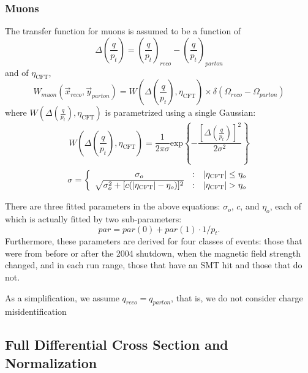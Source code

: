 \subsubsection{Muons}

The transfer function for muons is assumed to be a
function of
\begin{equation}
\Delta\left( \frac{q}{p_t}\right) =
\left( \frac{q}{p_t}\right)_{reco} -
\left( \frac{q}{p_t}\right)_{parton}
\end{equation}
\noindent and of $\eta_\mathrm{CFT}$,
\begin{equation}
W_{muon}(\vec{x}_{reco}, \vec{y}_{parton}) =
W\left(\Delta\left( \frac{q}{p_t}\right),
\eta_\mathrm{CFT}\right) \times 
\delta(\Omega_{reco} - \Omega_{parton})
\end{equation}
\noindent where $W\left(\Delta\left( \frac{q}{p_t}\right),
\eta_\mathrm{CFT}\right)$ is parametrized using a single Gaussian:
\begin{equation}
W\left(\Delta\left( \frac{q}{p_t}\right), \eta_\mathrm{CFT}\right) = 
\frac{1}{2\pi\sigma}\mathrm{exp}
\left\{-\frac{\left[\Delta
\left( \frac{q}{p_t} \right)\right]^2}
{2\sigma^2}\right\}
\end{equation}
\begin{equation}
\sigma  =  \left\{ 
\begin{array} {c@{\quad:\quad}l} \sigma_o &
|\eta_\mathrm{CFT}| \le \eta_o \\
\sqrt{\sigma^2_o + [c(|\eta_\mathrm{CFT}| - \eta_o)]^2} &
|\eta_\mathrm{CFT}| > \eta_o 
\end{array} \right.
\end{equation}

\noindent There are three fitted parameters in the above equations:
$\sigma_o$, $c$, and $\eta_o$, each of which is actually fitted by two
sub-parameters:
\begin{equation}
par = par(0) + par(1) \cdot 1/p_t.
\end{equation}
\noindent Furthermore, these parameters are derived for four classes
of events: those that were from before or after the 2004 shutdown,
when the magnetic field strength changed, and in each run range, those
that have an SMT hit and those that do not.

As a simplification, we assume $q_{reco} = q_{parton}$, that is, we
do not consider charge misidentification


\subsection{Full Differential Cross Section and Normalization}

